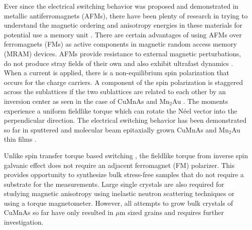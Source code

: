 \documentclass[10pt,doublespacing,edeposit]{uiucthesis2020}
\begin{document}
\begin{mainmatter}
Ever since the electrical switching behavior was proposed \cite{Zelezny2014} and demonstrated \cite{Wadley2016} in metallic antiferromagnets (AFMs), there have been plenty of research in trying to understand the magnetic ordering and anisotropy energies in these materials for potential use a memory unit \cite{Grzybowski2017,Bodnar2019,Wadley2013,Hills2015,Wadley2015,Saidl2017,Yang2020}. There are certain advantages of using AFMs over ferromagnets (FMs) as active components in magnetic random access memory (MRAM) devices. AFMs provide resistance to external magnetic perturbations, do not produce stray fields of their own and also exhibit ultrafast dynamics \cite{Wadley2016}. When a current is applied, there is a non-equilibrium spin polarization that occurs for the charge carriers. A component of the spin polarization is staggered across the sublattices if the two sublattices are related to each other by an inversion center as seen in the case of CuMnAs and Mn$_2$Au \cite{Zelezny2014,Zelezny2017}. The moments experience a uniform fieldlike torque which can rotate the N\'eel vector into the perpendicular direction. The electrical switching behavior has been demonstrated so far in sputtered and molecular beam epitaxially grown CuMnAs and Mn$_2$Au thin films \cite{Wadley2016,Meinert2018,Matalla-Wagner2019}. 

Unlike spin transfer torque based switching \cite{Gomonay2010}, the fieldlike torque from inverse spin galvanic effect does not require an adjacent ferromagnet (FM) polarizer. This provides opportunity to synthesize bulk stress-free samples that do not require a substrate for the measurements. Large single crystals are also required for studying magnetic anisotropy using inelastic neutron scattering techniques or using a torque magnetometer\cite{Karigerasi2020,Yang2020}. However, all attempts to grow bulk crystals of CuMnAs so far have only resulted in $\mu$m sized grains \cite{Volny2020} and requires further investigation.


\end{mainmatter}
\end{document}
